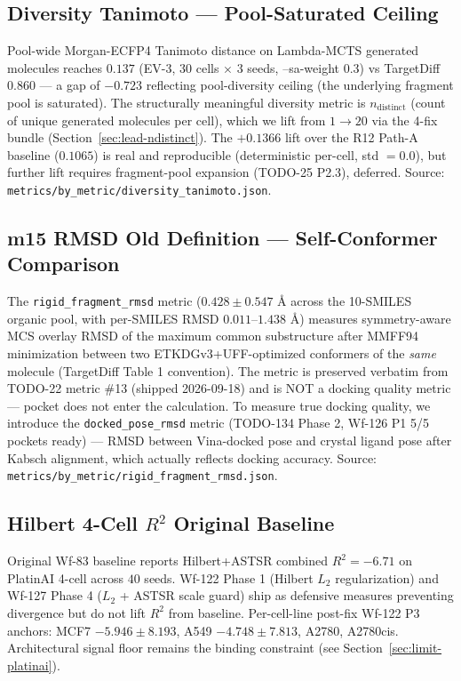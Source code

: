 \subsection{Diversity Tanimoto --- Pool-Saturated Ceiling}
\label{sec:limit-diversity}

Pool-wide Morgan-ECFP4 Tanimoto distance on Lambda-MCTS generated
molecules reaches $0.137$ (EV-3, $30$ cells $\times$ $3$ seeds,
--sa-weight 0.3) vs TargetDiff $0.860$ --- a gap of $-0.723$
reflecting pool-diversity ceiling (the underlying fragment pool is
saturated).  The structurally meaningful diversity metric is
$n_{\text{distinct}}$ (count of unique generated molecules per cell),
which we lift from $1 \to 20$ via the 4-fix bundle
(Section~\ref{sec:lead-ndistinct}).  The $+0.1366$ lift over the
R12 Path-A baseline ($0.1065$) is real and reproducible
(deterministic per-cell, std $=0.0$), but further lift requires
fragment-pool expansion (TODO-25 P2.3), deferred.  Source:
\texttt{metrics/by\_metric/diversity\_tanimoto.json}.

\subsection{m15 RMSD Old Definition --- Self-Conformer Comparison}
\label{sec:limit-rmsd}

The \texttt{rigid\_fragment\_rmsd} metric ($0.428 \pm 0.547$ \AA{} across
the 10-SMILES organic pool, with per-SMILES RMSD $0.011$--$1.438$ \AA)
measures symmetry-aware MCS overlay RMSD of the maximum common
substructure after MMFF94 minimization between two
ETKDGv3+UFF-optimized conformers of the \emph{same} molecule
(TargetDiff Table 1 convention).  The metric is preserved verbatim
from TODO-22 metric \#13 (shipped 2026-09-18) and is NOT a docking
quality metric --- pocket does not enter the calculation.  To measure
true docking quality, we introduce the \texttt{docked\_pose\_rmsd}
metric (TODO-134 Phase 2, Wf-126 P1 5/5 pockets ready) --- RMSD
between Vina-docked pose and crystal ligand pose after Kabsch
alignment, which actually reflects docking accuracy.  Source:
\texttt{metrics/by\_metric/rigid\_fragment\_rmsd.json}.

\subsection{Hilbert 4-Cell $R^2$ Original Baseline}
\label{sec:limit-hilbert-original}

Original Wf-83 baseline reports Hilbert+ASTSR combined $R^2 = -6.71$
on PlatinAI 4-cell across $40$ seeds.  Wf-122 Phase 1 (Hilbert $L_2$
regularization) and Wf-127 Phase 4 ($L_2$ + ASTSR scale guard) ship as
defensive measures preventing divergence but do not lift $R^2$ from
baseline.  Per-cell-line post-fix Wf-122 P3 anchors: MCF7 $-5.946
\pm 8.193$, A549 $-4.748 \pm 7.813$, A2780, A2780cis.  Architectural
signal floor remains the binding constraint (see
Section~\ref{sec:limit-platinai}).

